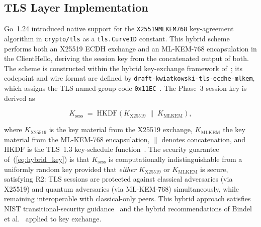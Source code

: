 \documentclass{ieeetj}
\begin{document}
\subsection{TLS Layer Implementation}
\label{sec:method_tls}

Go~1.24 introduced native support for the \texttt{X25519MLKEM768} key-agreement
algorithm in \texttt{crypto/tls} as a \texttt{tls.CurveID} constant. This hybrid
scheme performs both an X25519 ECDH exchange and an ML-KEM-768 encapsulation in
the ClientHello, deriving the session key from the concatenated output of both.
The scheme is constructed within the hybrid key-exchange framework
of~\cite{ietf_hybrid_tls}; its codepoint and wire format are defined by
\texttt{draft-kwiatkowski-tls-ecdhe-mlkem}, which assigns the TLS named-group
code \texttt{0x11EC}~\cite{ietf_x25519mlkem768}. The Phase~3 session key is
derived as

\begin{equation}
K_{\mathrm{sess}} \;=\; \mathrm{HKDF}\!\left(K_{\mathrm{X25519}}\;\big\|\;K_{\mathrm{MLKEM}}\right),
\label{eq:hybrid_key}
\end{equation}

where $K_{\mathrm{X25519}}$ is the key material from the X25519 exchange,
$K_{\mathrm{MLKEM}}$ the key material from the ML-KEM-768 encapsulation, $\|$
denotes concatenation, and $\mathrm{HKDF}$ is the TLS~1.3 key-schedule
function~\cite{ietf_hybrid_tls}. The security guarantee of~(\ref{eq:hybrid_key})
is that $K_{\mathrm{sess}}$ is computationally indistinguishable from a uniformly
random key provided that \emph{either} $K_{\mathrm{X25519}}$ or
$K_{\mathrm{MLKEM}}$ is secure, satisfying R2: TLS sessions are protected against
classical adversaries (via X25519) and quantum adversaries (via ML-KEM-768)
simultaneously, while remaining interoperable with classical-only peers. This
hybrid approach satisfies NIST transitional-security
guidance~\cite{barker2020transition} and the hybrid recommendations of Bindel et
al.~\cite{bindel2017} applied to key exchange.
\end{document}
